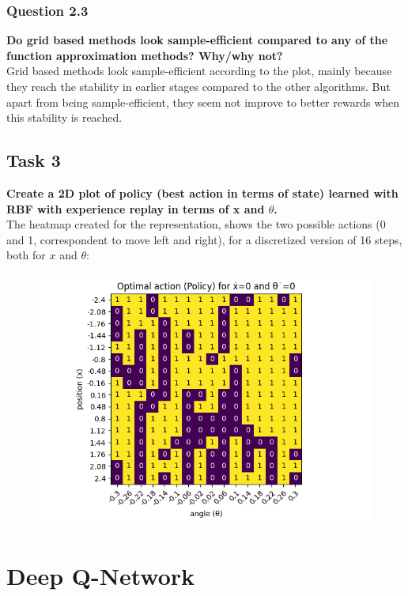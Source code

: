 \documentclass[12pt]{article}
\begin{document}
\subsubsection{Question 2.3}
\textbf{
Do grid based methods look sample-efficient compared to any of the function approximation methods? Why/why not?
}\\

Grid based methods look sample-efficient according to the plot, mainly because they reach the stability in earlier stages compared to the other algorithms. But apart from being sample-efficient, they seem not improve to better rewards when this stability is reached.

\subsection{Task 3}
\textbf{Create a 2D plot of policy (best action in terms of state) learned with RBF
with experience replay in terms of x and $\theta$.} \\

The heatmap created for the representation, shows the two possible actions (0 and 1, correspondent to move left and right), for a discretized version of 16 steps, both for $x$ and $\theta$:

\begin{figure}[h]
    \centering
    \includegraphics[scale=0.75]{exercise-4/plots/task-3.png}
    \label{fig:my_label}
\end{figure}

\section{Deep Q-Network}
\end{document}
